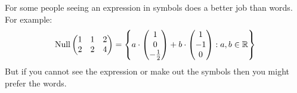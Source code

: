 For some people seeing an expression in symbols does a better job than words.  For example:
\begin{equation}
    \operatorname{Null}
    \begin{pmatrix}
        1 & 1 & 2\\ 2 & 2 & 4
    \end{pmatrix}
    = \left\{
        a\cdot
        \begin{pmatrix}
            1 \\ 0 \\ -\frac{1}{2}
        \end{pmatrix}
        +
        b\cdot
        \begin{pmatrix}
            1 \\ -1 \\ 0 
        \end{pmatrix}    
        :
        a,b\in \mathbb{R}
        \right\}        
\end{equation}
But if you cannot see the expression or make out the symbols then you might prefer the words.
